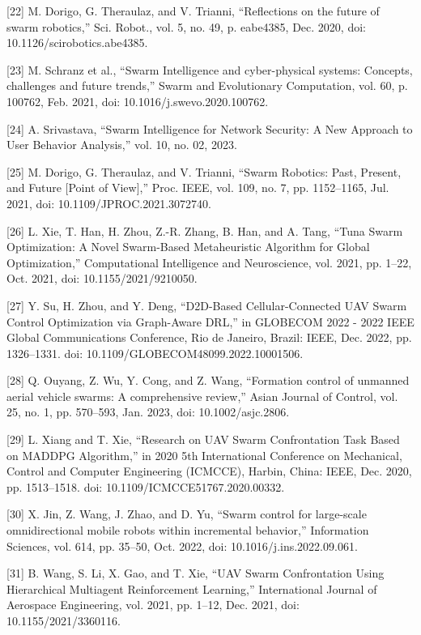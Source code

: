 [22] M. Dorigo, G. Theraulaz, and V. Trianni, “Reflections on the future of swarm robotics,” Sci. Robot., vol. 5, no. 49, p. eabe4385, Dec. 2020, doi: 10.1126/scirobotics.abe4385.


[23] M. Schranz et al., “Swarm Intelligence and cyber-physical systems: Concepts, challenges and future trends,” Swarm and Evolutionary Computation, vol. 60, p. 100762, Feb. 2021, doi: 10.1016/j.swevo.2020.100762.


[24] A. Srivastava, “Swarm Intelligence for Network Security: A New Approach to User Behavior Analysis,” vol. 10, no. 02, 2023.


[25] M. Dorigo, G. Theraulaz, and V. Trianni, “Swarm Robotics: Past, Present, and Future [Point of View],” Proc. IEEE, vol. 109, no. 7, pp. 1152–1165, Jul. 2021, doi: 10.1109/JPROC.2021.3072740.


[26] L. Xie, T. Han, H. Zhou, Z.-R. Zhang, B. Han, and A. Tang, “Tuna Swarm Optimization: A Novel Swarm-Based Metaheuristic Algorithm for Global Optimization,” Computational Intelligence and Neuroscience, vol. 2021, pp. 1–22, Oct. 2021, doi: 10.1155/2021/9210050.


[27] Y. Su, H. Zhou, and Y. Deng, “D2D-Based Cellular-Connected UAV Swarm Control Optimization via Graph-Aware DRL,” in GLOBECOM 2022 - 2022 IEEE Global Communications Conference, Rio de Janeiro, Brazil: IEEE, Dec. 2022, pp. 1326–1331. doi: 10.1109/GLOBECOM48099.2022.10001506.


[28] Q. Ouyang, Z. Wu, Y. Cong, and Z. Wang, “Formation control of unmanned aerial vehicle swarms: A comprehensive review,” Asian Journal of Control, vol. 25, no. 1, pp. 570–593, Jan. 2023, doi: 10.1002/asjc.2806.


[29] L. Xiang and T. Xie, “Research on UAV Swarm Confrontation Task Based on MADDPG Algorithm,” in 2020 5th International Conference on Mechanical, Control and Computer Engineering (ICMCCE), Harbin, China: IEEE, Dec. 2020, pp. 1513–1518. doi: 10.1109/ICMCCE51767.2020.00332.


[30] X. Jin, Z. Wang, J. Zhao, and D. Yu, “Swarm control for large-scale omnidirectional mobile robots within incremental behavior,” Information Sciences, vol. 614, pp. 35–50, Oct. 2022, doi: 10.1016/j.ins.2022.09.061.


[31] B. Wang, S. Li, X. Gao, and T. Xie, “UAV Swarm Confrontation Using Hierarchical Multiagent Reinforcement Learning,” International Journal of Aerospace Engineering, vol. 2021, pp. 1–12, Dec. 2021, doi: 10.1155/2021/3360116.



